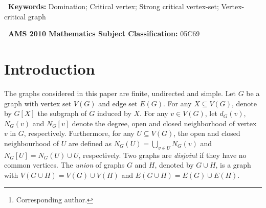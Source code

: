 \documentclass[a4paper,11pt]{article}
\title{\vspace{-9mm}{The Existence of Graph whose Vertex Set Can be Partitioned into a Fixed Number of Domination Strong Critical Vertex-sets\thanks{This
work is supported by NSFC (12061047);  Undergraduate Innovation Training Project of Hubei Province (2021Byb004); Foundation of Cultivation of Scientific Institutions of Jianghan University (06210033).}}}
\author{Weisheng Zhao$^{1,2,}$\footnote{Corresponding author.}~, Ying Li$^{1}$,  Ruizhi Lin$^{3}$
\\\footnotesize{1. School of Artificial Intelligence, Jianghan University,}
\vspace{-0.2cm}
\\\footnotesize{Wuhan, Hubei 430056, China}
\vspace{-0.10cm}
\\\footnotesize{2. Institute for Interdisciplinary Research, Jianghan University,}
\vspace{-0.2cm}
\\\footnotesize{Wuhan, Hubei 430056, China}
\vspace{-0.10cm}
\\\footnotesize{3. School of computer science and mathematics, Fujian University}
\vspace{-0.2cm}
\\\footnotesize{of Technology, Fuzhou, Fujian, 350118, China}
\vspace{-0.05cm}
\\\small{E-mail addresses: weishengzhao101@aliyun.com,  liying1838@163.com,}
\vspace{-0.2cm}
\\\small{~linruizhi2018@fjut.edu.cn~~~~~~~~~~~~~}}
\date{}
\numberwithin{equation}{section}
\begin{document}
\maketitle

\vspace{-0.8cm}
\begin{abstract}
Let $\gamma(G)$ denote the domination number of a graph $G$.
A vertex $v\in V(G)$ is called a \emph{critical vertex} of $G$ if $\gamma(G-v)=\gamma(G)-1$. A graph is called \emph{vertex-critical} if every vertex of it is critical. In this paper, we correspondingly introduce two such definitions: (i) a set $S\subseteq V(G)$ is called a \emph{strong critical vertex-set} of $G$ if $\gamma(G-S)=\gamma(G)-|S|$; (ii) a graph $G$ is called \emph{strong $l$-vertex-sets-critical} if $V(G)$ can be partitioned into $l$  strong critical vertex-sets of $G$. Whereafter, we give some properties of strong $l$-vertex-sets-critical graphs by extending  the previous  results of vertex-critical graphs. As the core work, we study on the existence of this class of graphs and obtain that there exists a strong $l$-vertex-sets-critical connected graph if and only if $l\notin\{2,3,5\}$.
\vspace{0.0cm}
\end{abstract}

\noindent\textbf{~Keywords:} {\small Domination; Critical vertex; Strong critical vertex-set; Vertex-critical graph}

\noindent\textbf{~AMS 2010 Mathematics Subject Classification:} 05C69

\section{Introduction}

\vspace{-1mm}
The graphs considered in this paper are finite, undirected and simple. Let $G$ be a graph with vertex set $V(G)$ and edge set $E(G)$. For any $X\subseteq V(G)$, denote by $G[X]$ the subgraph of $G$ induced by $X$. For any $v\in V(G)$, let $d_G(v)$, $N_{G}(v)$ and $N_{G}[v]$ denote the degree, open  and closed neighborhood  of vertex $v$ in $G$, respectively. Furthermore, for any $U\subseteq V(G)$, the open and closed neighbourhood of $U$ are defined as $N_G(U)=\bigcup\limits_{v\in U}N_G(v)$ and $N_G[U]=N_G(U)\cup U$, respectively. Two graphs are \emph{disjoint} if they have no common vertices.
The \emph{union} of graphs $G$ and $H$, denoted by $G\cup H$, is a graph with $V(G\cup H)=V(G)\cup V(H)$ and $E(G\cup H)=E(G)\cup E(H)$.
\end{document}
